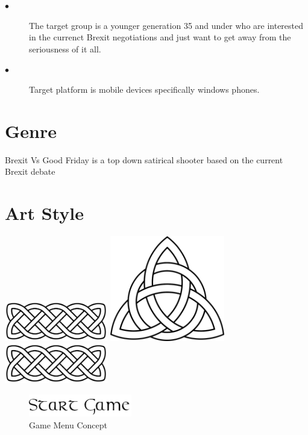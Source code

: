 \documentclass[a4paper]{scrreprt}
\begin{document}
    \begin{description}
        \item[$\bullet$] The target group is a younger generation 35 and under who are interested in the currenct Brexit negotiations and just want to get away from the seriousness of it all.
        \item[$\bullet$] Target platform is mobile devices specifically windows phones.
    \end{description}

    \section{Genre}
    Brexit Vs Good Friday is a top down satirical shooter based on the current Brexit debate

    \section{Art Style}

    \centering
    \includegraphics[width=4.5cm]{celtic-knot}
    \includegraphics[width=5cm]{celtic-knot-arrow}
    \includegraphics[width=4.5cm]{celtic-knot}
    \begin{figure}[H]
        \centering
        \includegraphics[width=4.5cm]{start-game}
        \caption{\label{fig:art} Game Menu Concept}
    \end{figure}
\end{document}
